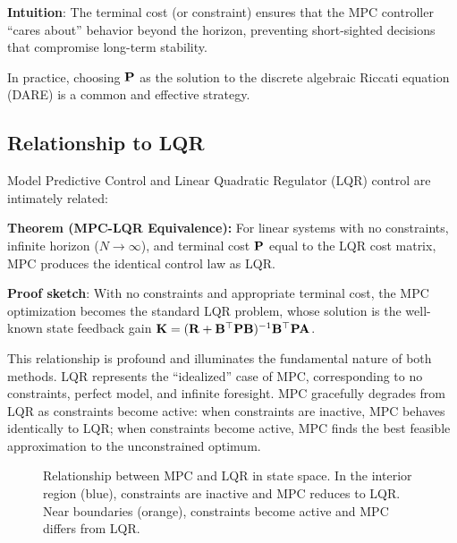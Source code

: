 \textbf{Intuition}: The terminal cost (or constraint) ensures that the MPC controller ``cares about'' behavior beyond the horizon, preventing short-sighted decisions that compromise long-term stability.

In practice, choosing $\mathbf{P}$ as the solution to the discrete algebraic Riccati equation (DARE) is a common and effective strategy.

\subsection{Relationship to LQR}

Model Predictive Control and Linear Quadratic Regulator (LQR) control are intimately related:

\textbf{Theorem (MPC-LQR Equivalence):} For linear systems with no constraints, infinite horizon ($N \to \infty$), and terminal cost $\mathbf{P}$ equal to the LQR cost matrix, MPC produces the identical control law as LQR.

\textbf{Proof sketch}: With no constraints and appropriate terminal cost, the MPC optimization becomes the standard LQR problem, whose solution is the well-known state feedback gain $\mathbf{K} = (\mathbf{R} + \mathbf{B}^\top \mathbf{P} \mathbf{B})^{-1} \mathbf{B}^\top \mathbf{P} \mathbf{A}$.

This relationship is profound and illuminates the fundamental nature of both methods. LQR represents the ``idealized'' case of MPC, corresponding to no constraints, perfect model, and infinite foresight. MPC gracefully degrades from LQR as constraints become active: when constraints are inactive, MPC behaves identically to LQR; when constraints become active, MPC finds the best feasible approximation to the unconstrained optimum.

\begin{figure}[htbp]
\centering
{}
\caption{Relationship between MPC and LQR in state space. In the interior region (blue), constraints are inactive and MPC reduces to LQR. Near boundaries (orange), constraints become active and MPC differs from LQR.}
\label{fig:mpc_lqr_regions}
\end{figure}

